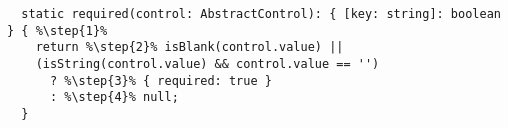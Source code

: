 \begin{verbatim}
  static required(control: AbstractControl): { [key: string]: boolean } { %\step{1}%
    return %\step{2}% isBlank(control.value) ||
    (isString(control.value) && control.value == '')
      ? %\step{3}% { required: true }
      : %\step{4}% null;
  }
\end{verbatim}
